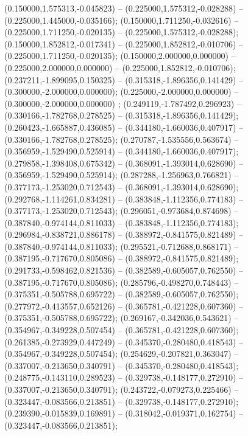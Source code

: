 (0.150000,1.575313,-0.045823) -- (0.225000,1.575312,-0.028288) -- (0.225000,1.445000,-0.035166);
 (0.150000,1.711250,-0.032616) -- (0.225000,1.711250,-0.020135) -- (0.225000,1.575312,-0.028288);
 (0.150000,1.852812,-0.017341) -- (0.225000,1.852812,-0.010706) -- (0.225000,1.711250,-0.020135);
 (0.150000,2.000000,0.000000) -- (0.225000,2.000000,0.000000) -- (0.225000,1.852812,-0.010706);
 (0.237211,-1.899095,0.150325) -- (0.315318,-1.896356,0.141429) -- (0.300000,-2.000000,0.000000);
 (0.225000,-2.000000,0.000000) -- (0.300000,-2.000000,0.000000) ;
 (0.249119,-1.787492,0.296923) -- (0.330166,-1.782768,0.278525) -- (0.315318,-1.896356,0.141429);
 (0.260423,-1.665887,0.436085) -- (0.344180,-1.660036,0.407917) -- (0.330166,-1.782768,0.278525);
 (0.270787,-1.535556,0.563674) -- (0.356959,-1.529490,0.525914) -- (0.344180,-1.660036,0.407917);
 (0.279858,-1.398408,0.675342) -- (0.368091,-1.393014,0.628690) -- (0.356959,-1.529490,0.525914);
 (0.287288,-1.256963,0.766821) -- (0.377173,-1.253020,0.712543) -- (0.368091,-1.393014,0.628690);
 (0.292768,-1.114261,0.834281) -- (0.383848,-1.112356,0.774183) -- (0.377173,-1.253020,0.712543);
 (0.296051,-0.973684,0.874698) -- (0.387840,-0.974144,0.811033) -- (0.383848,-1.112356,0.774183);
 (0.296984,-0.838721,0.886178) -- (0.388972,-0.841575,0.821489) -- (0.387840,-0.974144,0.811033);
 (0.295521,-0.712688,0.868171) -- (0.387195,-0.717670,0.805086) -- (0.388972,-0.841575,0.821489);
 (0.291733,-0.598462,0.821536) -- (0.382589,-0.605057,0.762550) -- (0.387195,-0.717670,0.805086);
 (0.285796,-0.498270,0.748443) -- (0.375351,-0.505788,0.695722) -- (0.382589,-0.605057,0.762550);
 (0.277972,-0.413557,0.652126) -- (0.365781,-0.421228,0.607360) -- (0.375351,-0.505788,0.695722);
 (0.269167,-0.342036,0.543621) -- (0.354967,-0.349228,0.507454) -- (0.365781,-0.421228,0.607360);
 (0.261385,-0.273929,0.447249) -- (0.345370,-0.280480,0.418543) -- (0.354967,-0.349228,0.507454);
 (0.254629,-0.207821,0.363047) -- (0.337007,-0.213650,0.340791) -- (0.345370,-0.280480,0.418543);
 (0.248775,-0.143110,0.289523) -- (0.329738,-0.148177,0.272910) -- (0.337007,-0.213650,0.340791);
 (0.243722,-0.079273,0.225466) -- (0.323447,-0.083566,0.213851) -- (0.329738,-0.148177,0.272910);
 (0.239390,-0.015839,0.169891) -- (0.318042,-0.019371,0.162754) -- (0.323447,-0.083566,0.213851);
